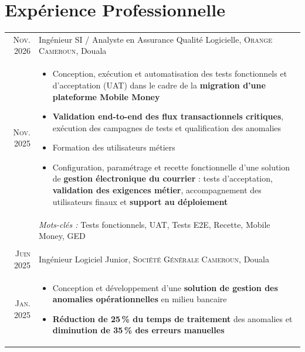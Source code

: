 %
%
%

\section{\texorpdfstring{\color{accentcolor}Expérience Professionnelle}{Expérience Professionnelle}}
\begin{longtable}{R{\leftcolumnlength}|p{\rightcolumnlength}}
 	\textsc{Nov. 2026} & Ingénieur SI / Analyste en Assurance Qualité Logicielle, \textsc{Orange Cameroun}, Douala\\
 	\textsc{Nov. 2025} &
 	\footnotesize{
 	 	\begin{itemize}
			\item Conception, exécution et automatisation des tests fonctionnels et d'acceptation (UAT) dans le cadre de la \textbf{migration d'une plateforme Mobile Money}
			\item \textbf{Validation end-to-end des flux transactionnels critiques}, exécution des campagnes de tests et qualification des anomalies
			\item Formation des utilisateurs métiers
			\item Configuration, paramétrage et recette fonctionnelle d'une solution de \textbf{gestion électronique du courrier} : tests d'acceptation, \textbf{validation des exigences métier}, accompagnement des utilisateurs finaux et \textbf{support au déploiement}
		\end{itemize}
		\vspace{-1em}
	}\\&
 	\footnotesize{\emph{Mots-clés :} Tests fonctionnels, UAT, Tests E2E, Recette, Mobile Money, GED}\\
  \\
 	\textsc{Juin 2025} & Ingénieur Logiciel Junior, \textsc{Société Générale Cameroun}, Douala\\
 	\textsc{Jan. 2025} &
 	\footnotesize{
 	 	\begin{itemize}
			\item Conception et développement d'une \textbf{solution de gestion des anomalies opérationnelles} en milieu bancaire
			\item \textbf{Réduction de 25\,\% du temps de traitement} des anomalies et \textbf{diminution de 35\,\% des erreurs manuelles}

\end{itemize}}
\end{longtable}
